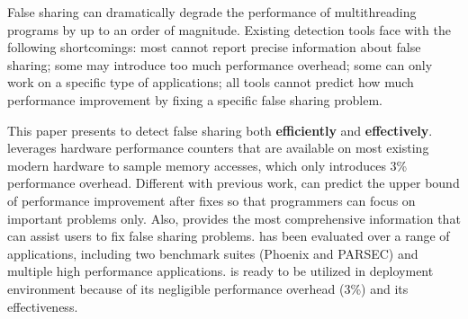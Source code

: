 False sharing can dramatically degrade the performance of multithreading programs by up to an order of magnitude. 
Existing detection tools face with the following shortcomings: most cannot report precise information about false sharing; some may introduce too much performance overhead; some can only work on a specific type of applications; all tools cannot predict how much performance improvement by fixing a specific false sharing problem. 

This paper presents \cheetah{} to detect false sharing both {\bf efficiently} and {\bf effectively}. \cheetah{} leverages hardware performance counters that are available on most existing modern hardware to sample memory accesses, which only introduces 3\% performance overhead. Different with previous work, \cheetah{} can predict the upper bound of performance improvement after fixes so that programmers can focus on important problems only. Also, \cheetah{} provides the most comprehensive information that can assist users to fix false sharing problems. \cheetah{} has been evaluated over a range of applications, including two benchmark suites (Phoenix and PARSEC) and multiple high performance applications. \Cheetah{} is ready to be utilized in deployment environment because of its negligible performance overhead (3\%) and its effectiveness.  